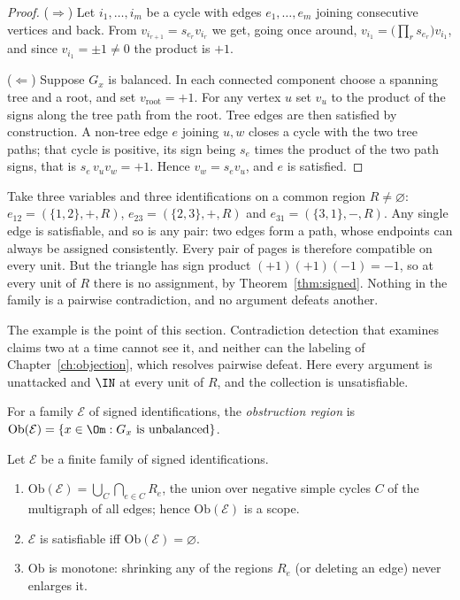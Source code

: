 \begin{proof}
($\Rightarrow$) Let $i_1,\dots,i_m$ be a cycle with edges $e_1,\dots,e_m$ joining consecutive vertices and back. From $v_{i_{r+1}}=s_{e_r}v_{i_r}$ we get, going once around, $v_{i_1}=\bigl(\prod_r s_{e_r}\bigr)v_{i_1}$, and since $v_{i_1}=\pm1\ne0$ the product is $+1$.

($\Leftarrow$) Suppose $G_x$ is balanced. In each connected component choose a spanning tree and a root, and set $v_{\mathrm{root}}=+1$. For any vertex $u$ set $v_u$ to the product of the signs along the tree path from the root. Tree edges are then satisfied by construction. A non-tree edge $e$ joining $u,w$ closes a cycle with the two tree paths; that cycle is positive, its sign being $s_e$ times the product of the two path signs, that is $s_e\,v_uv_w=+1$. Hence $v_w=s_ev_u$, and $e$ is satisfied.
\end{proof}

\begin{counterexample}\label{cex:triangle}
Take three variables and three identifications on a common region $R\neq\varnothing$: $e_{12}=(\{1,2\},+,R)$, $e_{23}=(\{2,3\},+,R)$ and $e_{31}=(\{3,1\},-,R)$. Any single edge is satisfiable, and so is any pair: two edges form a path, whose endpoints can always be assigned consistently. Every pair of pages is therefore compatible on every unit. But the triangle has sign product $(+1)(+1)(-1)=-1$, so at every unit of $R$ there is no assignment, by Theorem~\ref{thm:signed}. Nothing in the family is a pairwise contradiction, and no argument defeats another.
\end{counterexample}

The example is the point of this section. Contradiction detection that examines claims two at a time cannot see it, and neither can the labeling of Chapter~\ref{ch:objection}, which resolves pairwise defeat. Here every argument is unattacked and $\IN$ at every unit of $R$, and the collection is unsatisfiable.

\begin{definition}\label{def:obstruction}
For a family $\mathcal E$ of signed identifications, the \emph{obstruction region} is $\mathrm{Ob}(\mathcal E)=\{x\in\Om: G_x\text{ is unbalanced}\}$.
\end{definition}

\begin{theorem}\label{thm:obs}
Let $\mathcal E$ be a finite family of signed identifications.
\begin{enumerate}[label=(\alph*)]
\item $\mathrm{Ob}(\mathcal E)=\bigcup_{C}\bigcap_{e\in C}R_e$, the union over negative simple cycles $C$ of the multigraph of all edges; hence $\mathrm{Ob}(\mathcal E)$ is a scope.
\item $\mathcal E$ is satisfiable iff $\mathrm{Ob}(\mathcal E)=\varnothing$.
\item $\mathrm{Ob}$ is monotone: shrinking any of the regions $R_e$ (or deleting an edge) never enlarges it.
\end{enumerate}
\end{theorem}

